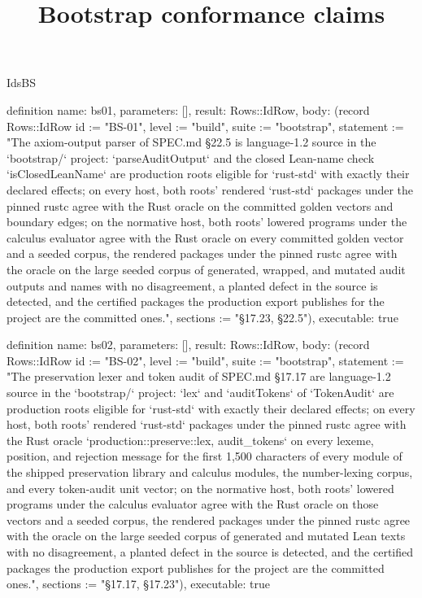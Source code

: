 \begin{lexlean}{IdsBS}
\title{Bootstrap conformance claims}
\begin{semanticmodule}
definition{
  name: bs01,
  parameters: [],
  result: Rows::IdRow,
  body: (record Rows::IdRow {id := "BS-01", level := "build", suite := "bootstrap", statement := "The axiom-output parser of SPEC.md §22.5 is language-1.2 source in the `bootstrap/` project: `parseAuditOutput` and the closed Lean-name check `isClosedLeanName` are production roots eligible for `rust-std` with exactly their declared effects; on every host, both roots' rendered `rust-std` packages under the pinned rustc agree with the Rust oracle on the committed golden vectors and boundary edges; on the normative host, both roots' lowered programs under the calculus evaluator agree with the Rust oracle on every committed golden vector and a seeded corpus, the rendered packages under the pinned rustc agree with the oracle on the large seeded corpus of generated, wrapped, and mutated audit outputs and names with no disagreement, a planted defect in the source is detected, and the certified packages the production export publishes for the project are the committed ones.", sections := "§17.23, §22.5"}),
  executable: true
}

definition{
  name: bs02,
  parameters: [],
  result: Rows::IdRow,
  body: (record Rows::IdRow {id := "BS-02", level := "build", suite := "bootstrap", statement := "The preservation lexer and token audit of SPEC.md §17.17 are language-1.2 source in the `bootstrap/` project: `lex` and `auditTokens` of `TokenAudit` are production roots eligible for `rust-std` with exactly their declared effects; on every host, both roots' rendered `rust-std` packages under the pinned rustc agree with the Rust oracle `production::preserve::{lex, audit_tokens}` on every lexeme, position, and rejection message for the first 1,500 characters of every module of the shipped preservation library and calculus modules, the number-lexing corpus, and every token-audit unit vector; on the normative host, both roots' lowered programs under the calculus evaluator agree with the Rust oracle on those vectors and a seeded corpus, the rendered packages under the pinned rustc agree with the oracle on the large seeded corpus of generated and mutated Lean texts with no disagreement, a planted defect in the source is detected, and the certified packages the production export publishes for the project are the committed ones.", sections := "§17.17, §17.23"}),
  executable: true
}


\end{semanticmodule}
\end{lexlean}
